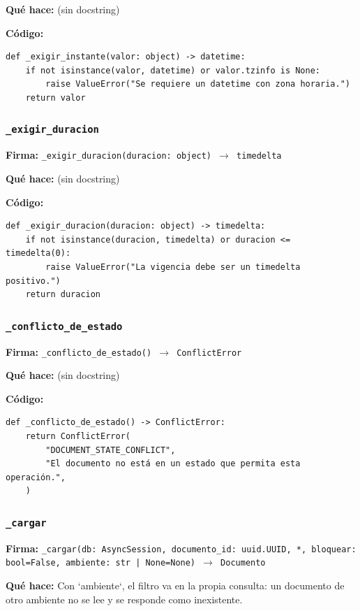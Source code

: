 \documentclass[11pt,a4paper]{article}
\begin{document}
\textbf{Qué hace:} (sin docstring)

\textbf{Código:}
\begin{lstlisting}
def _exigir_instante(valor: object) -> datetime:
    if not isinstance(valor, datetime) or valor.tzinfo is None:
        raise ValueError("Se requiere un datetime con zona horaria.")
    return valor
\end{lstlisting}

\subsubsection*{\texttt{\_exigir\_duracion}}
\textbf{Firma:} \texttt{\_exigir\_duracion(duracion: object) $\rightarrow$ timedelta}

\textbf{Qué hace:} (sin docstring)

\textbf{Código:}
\begin{lstlisting}
def _exigir_duracion(duracion: object) -> timedelta:
    if not isinstance(duracion, timedelta) or duracion <= timedelta(0):
        raise ValueError("La vigencia debe ser un timedelta positivo.")
    return duracion
\end{lstlisting}

\subsubsection*{\texttt{\_conflicto\_de\_estado}}
\textbf{Firma:} \texttt{\_conflicto\_de\_estado() $\rightarrow$ ConflictError}

\textbf{Qué hace:} (sin docstring)

\textbf{Código:}
\begin{lstlisting}
def _conflicto_de_estado() -> ConflictError:
    return ConflictError(
        "DOCUMENT_STATE_CONFLICT",
        "El documento no está en un estado que permita esta operación.",
    )
\end{lstlisting}

\subsubsection*{\texttt{\_cargar}}
\textbf{Firma:} \texttt{\_cargar(db: AsyncSession, documento\_id: uuid.UUID, *, bloquear: bool=False, ambiente: str | None=None) $\rightarrow$ Documento}

\textbf{Qué hace:} Con `ambiente`, el filtro va en la propia consulta: un documento de otro ambiente no se lee y se
responde como inexistente.
\end{document}
